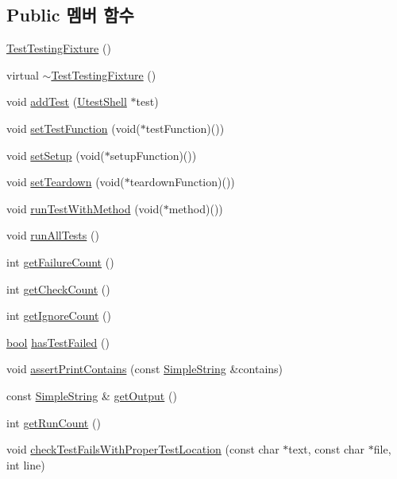 \subsection*{Public 멤버 함수}
\begin{DoxyCompactItemize}
\item 
\hyperlink{class_test_testing_fixture_a1b6868a3f5f44920886db2f97f912980}{Test\+Testing\+Fixture} ()
\item 
virtual \hyperlink{class_test_testing_fixture_a5d27dcbbbe33e037e03fce38798f835f}{$\sim$\+Test\+Testing\+Fixture} ()
\item 
void \hyperlink{class_test_testing_fixture_a5355d3dbb7e07dbb9370a30424b243dc}{add\+Test} (\hyperlink{class_utest_shell}{Utest\+Shell} $\ast$test)
\item 
void \hyperlink{class_test_testing_fixture_a33a8885dc222aca7925532acf20a390b}{set\+Test\+Function} (void($\ast$test\+Function)())
\item 
void \hyperlink{class_test_testing_fixture_a805445778315b69850bcedcaa70a3e69}{set\+Setup} (void($\ast$setup\+Function)())
\item 
void \hyperlink{class_test_testing_fixture_a9692f765bc333365f466b04b7b68df22}{set\+Teardown} (void($\ast$teardown\+Function)())
\item 
void \hyperlink{class_test_testing_fixture_af85eb87f76898101dd3f9bd876a4ad3b}{run\+Test\+With\+Method} (void($\ast$method)())
\item 
void \hyperlink{class_test_testing_fixture_a3702737cbcdf9e878580a28c05a15a15}{run\+All\+Tests} ()
\item 
int \hyperlink{class_test_testing_fixture_ae19339972571cddf48dfc77c6dcbd000}{get\+Failure\+Count} ()
\item 
int \hyperlink{class_test_testing_fixture_a927083e267ba03a20060630ad9f548d1}{get\+Check\+Count} ()
\item 
int \hyperlink{class_test_testing_fixture_af4df101c7fef3137eea781c903aad943}{get\+Ignore\+Count} ()
\item 
\hyperlink{avb__gptp_8h_af6a258d8f3ee5206d682d799316314b1}{bool} \hyperlink{class_test_testing_fixture_afda1658efda2d1a7ddfdcc3eab119e9c}{has\+Test\+Failed} ()
\item 
void \hyperlink{class_test_testing_fixture_aa6f2b8b5af4aff4e84e3291f170cbbd5}{assert\+Print\+Contains} (const \hyperlink{class_simple_string}{Simple\+String} \&contains)
\item 
const \hyperlink{class_simple_string}{Simple\+String} \& \hyperlink{class_test_testing_fixture_a17a31248a362b3190d2b195ba2a9616f}{get\+Output} ()
\item 
int \hyperlink{class_test_testing_fixture_a2102fc48107aa719abedc3df2f696b5b}{get\+Run\+Count} ()
\item 
void \hyperlink{class_test_testing_fixture_a232fa3da5742200d31d5a514c185e08d}{check\+Test\+Fails\+With\+Proper\+Test\+Location} (const char $\ast$text, const char $\ast$file, int line)
\end{DoxyCompactItemize}
